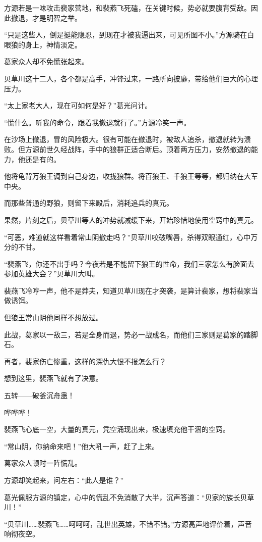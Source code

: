 \begin{this_body}
方源若是一味攻击裴家营地，和裴燕飞死磕，在关键时候，势必就要腹背受敌。因此撤退，才是明智之举。

“只是这些人，倒是挺能隐忍，到现在才被我逼出来，可见所图不小。”方源骑在白眼狼的身上，神情淡定。

葛家众人却不免慌张起来。

贝草川这十二人，各个都是高手，冲锋过来，一路所向披靡，带给他们巨大的心理压力。

“太上家老大人，现在可如何是好？”葛光问计。

“慌什么。听我的命令，跟着我撤退就行了。”方源冷笑一声。

在沙场上撤退，冒的风险极大。很有可能在撤退时，被敌人追杀，撤退就转为溃败。但方源前世久经战阵，手中的狼群正适合断后。顶着两方压力，安然撤退的能力，他还是有的。

他将龟背万狼王调到自己身边，收拢狼群。将百狼王、千狼王等等，都归纳在大军中央。

而那些普通的野狼，则留下来殿后，消耗追兵的真元。

果然，片刻之后，贝草川等人的冲势就减缓下来，开始珍惜地使用空窍中的真元。

“可恶，难道就这样看着常山阴撤走吗？”贝草川咬破嘴唇，杀得双眼通红，心中万分的不甘。

“裴燕飞，你还不出手吗？今夜若是不能留下狼王的性命，我们三家怎么有脸面去参加英雄大会？”贝草川大叫。

裴燕飞冷哼一声，他不是莽夫，知道贝草川现在才突袭，是算计裴家，想将裴家当做诱饵。

但狼王常山阴他同样不想放过。

此战，葛家以一敌三，若是全身而退，势必一战成名，而他们三家则是葛家的踏脚石。

再者，裴家伤亡惨重，这样的深仇大恨不报怎么行？

想到这里，裴燕飞就有了决意。

五转——破釜沉舟蛊！

哗哗哗！

裴燕飞心底一空，大量的真元，凭空涌现出来，极速填充他干涸的空窍。

“常山阴，你纳命来吧！”他大吼一声，赶了上来。

葛家众人顿时一阵慌乱。

方源却笑起来，问左右：“此人是谁？”

葛光佩服方源的镇定，心中的慌乱不免消散了大半，沉声答道：“贝家的族长贝草川！”

“贝草川……裴燕飞……呵呵呵，乱世出英雄，不错不错。”方源高声地评价着，声音响彻夜空。


\end{this_body}
